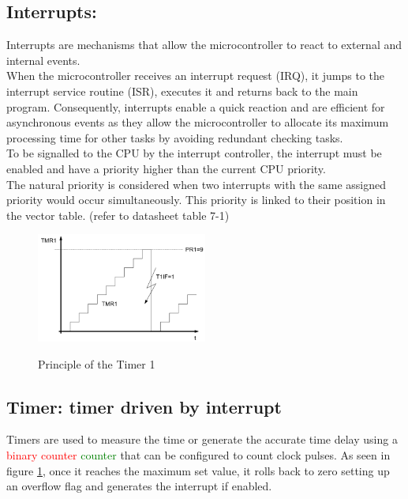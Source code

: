 \subsection{Interrupts:}

Interrupts are mechanisms that allow the microcontroller to react to external and internal events.\\
When the microcontroller receives an interrupt request (IRQ), it jumps to the interrupt service routine (ISR), executes it and returns back to the main program. 
Consequently, interrupts enable a quick reaction and are efficient for asynchronous events as they allow the microcontroller to allocate its maximum processing time for other tasks by avoiding redundant checking tasks.\\

To be signalled to the CPU by the interrupt controller, the interrupt must be enabled and have a priority higher than the current CPU priority.\\
The natural priority is considered when two interrupts with the same assigned priority would occur simultaneously. This priority is linked to their position in the vector table. (refer to datasheet table 7-1)

\begin{figure}
    \caption{Principle of the Timer 1}
        \centering
            \includegraphics[width=0.5\textwidth]{figures/software/t1_demo.png}
            \label{fig:t1_demo}
\end{figure}

\subsection{Timer: timer driven by interrupt}


Timers are used to measure the time or generate the accurate time delay using a \textcolor{red}{binary counter} \textcolor{green}{counter} that can be configured to count clock pulses. As seen in figure \ref{fig:t1_demo}, once it reaches the maximum set value, it rolls back to zero setting up an overflow flag and generates the interrupt if enabled. \\

